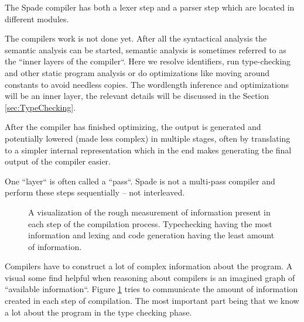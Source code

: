 The Spade compiler has both a lexer step and a parser step which are located in different modules.

The compilers work is not done yet. After all the syntactical analysis the semantic analysis can be started, semantic analysis is sometimes referred to as the ``inner layers of the compiler``. Here we resolve identifiers, run type-checking and other static program analysis or do optimizations like moving around constants to avoid needless copies. The wordlength inference and optimizations will be an inner layer, the relevant details will be discussed in the Section \ref{sec:TypeChecking}. 

After the compiler has finished optimizing, the output is generated and potentially lowered (made less complex) in multiple stages, often by translating to a simpler internal representation which in the end makes generating the final output of the compiler easier.

One ``layer`` is often called a ``pass``. Spade is not a multi-pass compiler and perform these steps sequentially -- not interleaved.
\cite{src:DragonBook}\cite{src:CraftingInterp}\cite{src:KKLectures}

\begin{figure}
\begin{center}
  \caption{A visualization of the rough measurement of information present in each step of the compilation process. Typechecking having the most information and lexing and code generation having the least amount of information.}
  \label{fig:InformationCompilation}
\end{center}
\end{figure}

Compilers have to construct a lot of complex information about the program. A visual some find helpful when reasoning about compilers is an imagined graph of ``available information``. Figure \ref{fig:InformationCompilation} tries to communicate the amount of information created in each step of compilation. The most important part being that we know a lot about the program in the type checking phase.

